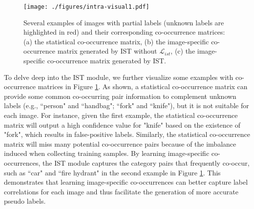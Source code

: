 \begin{figure}[!t]
   \centering
   \texttt{[image: ./figures/intra-visual1.pdf]}
   \caption{Several examples of images with partial labels (unknown labels are highlighted in red) and their corresponding co-occurrence matrices: (a) the statistical co-occurrence matrix, (b) the image-specific co-occurrence matrix generated by IST without $\mathcal{L}_{ist}$, (c) the image-specific co-occurrence matrix generated by IST.}
   \label{fig:vis-ist}
\end{figure}

To delve deep into the IST module, we further visualize some examples with co-occurrence matrices in Figure \ref{fig:vis-ist}. As shown, a statistical co-occurrence matrix can provide some common co-occurring pair information to complement unknown labels (e.g., ``person" and ``handbag"; ``fork" and ``knife"), but it is not suitable for each image. For instance, given the first example, the statistical co-occurrence matrix will output a high confidence value for "knife" based on the existence of "fork", which results in false-positive labels. Similarly, the statistical co-occurrence matrix will miss many potential co-occurrence pairs because of the imbalance induced when collecting training samples. By learning image-specific co-occurrences, the IST module captures the category pairs that frequently co-occur, such as ``car" and ``fire hydrant" in the second example in Figure \ref{fig:vis-ist}. This demonstrates that learning image-specific co-occurrences can better capture label correlations for each image and thus facilitate the generation of more accurate pseudo labels.

